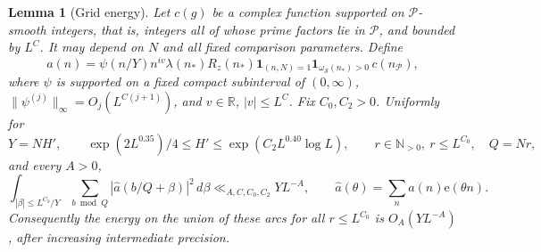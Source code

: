 \documentclass[11pt]{article}
\newtheorem{lemma}[theorem]{Lemma}
\theoremstyle{definition}
\newcommand{\e}{\mathrm e}
\newcommand{\N}{\mathbb N}
\newcommand{\R}{\mathbb R}
\newcommand{\ind}{\mathbf 1}
\newcommand{\Pset}{\mathcal P}
\newcommand{\Sset}{\mathcal S}
\newcommand{\Rz}{R_z}
\theoremstyle{remark}
\begin{document}
\begin{lemma}[Grid energy]\label{lem:grid}
Let $c(g)$ be a complex function supported on $\Pset$-smooth integers,
that is, integers all of whose prime factors lie in $\Pset$,
and bounded by $L^C$. It may depend on $N$ and all fixed comparison
parameters. Define
\begin{equation}\label{eq:grid-sequence}
a(n)=\psi(n/Y)n^{iv}\lambda(n_*)\Rz(n_*)
 \ind_{(n,N)=1}\ind_{\omega_{\Sset}(n_*)>0}\,c(n_{\Pset}),
\end{equation}
where $\psi$ is supported on a fixed compact subinterval of
$(0,\infty)$,
$\|\psi^{(j)}\|_\infty=O_j(L^{C(j+1)})$, and $v\in\R$, $|v|\le L^C$.
Fix $C_0,C_2>0$. Uniformly for
\begin{equation}\label{eq:grid-scales}
Y=NH',\qquad
\exp(2L^{0.35})/4\le H'\le\exp(C_2L^{0.40}\log L),
\qquad r\in\N_{>0},\ r\le L^{C_0},\quad Q=Nr,
\end{equation}
and every $A>0$,
\begin{equation}\label{eq:grid-energy}
\int_{|\beta|\le L^{C_0}/Y}
 \sum_{b\bmod Q}|\widehat a(b/Q+\beta)|^2\,d\beta
\ll_{A,C,C_0,C_2} YL^{-A},
\qquad \widehat a(\theta)=\sum_na(n)\e(\theta n).
\end{equation}
Consequently the energy on the union of these arcs for all
$r\le L^{C_0}$ is $O_A(YL^{-A})$, after increasing intermediate precision.
\end{lemma}
\end{document}
